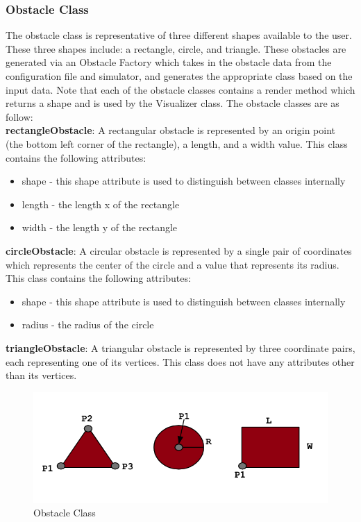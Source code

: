 \documentclass[10pt,letterpaper]{article}
\begin{document}
\subsubsection*{Obstacle Class}
The obstacle class is representative of three different shapes available to the user. These three shapes include: a rectangle, circle, and triangle. These obstacles are generated via an Obstacle Factory which takes in the obstacle data from the configuration file and simulator, and generates the appropriate class based on the input data. Note that each of the obstacle classes contains a render method which returns a shape and is used by the Visualizer class. The obstacle classes are as follow:\\

\noindent \textbf{rectangleObstacle}: A rectangular obstacle is represented by an origin point (the bottom left corner of the rectangle), a length, and a width value. This class contains the following attributes:
\begin{itemize}
    \item{shape - this shape attribute is used to distinguish between classes internally}
    \item{length - the length x of the rectangle}
    \item{width - the length y of the rectangle}
\end{itemize}

\noindent \textbf{circleObstacle}: A circular obstacle is represented by a single pair of coordinates which represents the center of the circle and a value that represents its radius. This class contains the following attributes:
\begin{itemize}
    \item{shape - this shape attribute is used to distinguish between classes internally}
    \item{radius - the radius of the circle}
\end{itemize}

\noindent \textbf{triangleObstacle}: A triangular obstacle is represented by three coordinate pairs, each representing one of its vertices. This class does not have any attributes other than its vertices. \\

\begin{figure}[!h]
    \centering
    \includegraphics[width= 11 cm]{figures/obstacles.png}
    \caption{Obstacle Class}
    \label{fig: obstacle}
\end{figure}
\end{document}
